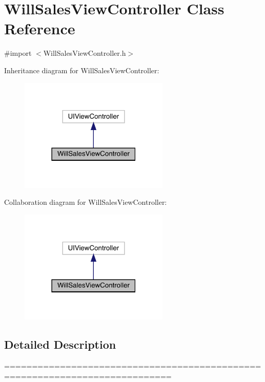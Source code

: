 \hypertarget{interface_will_sales_view_controller}{}\section{Will\+Sales\+View\+Controller Class Reference}
\label{interface_will_sales_view_controller}


{\ttfamily \#import $<$Will\+Sales\+View\+Controller.\+h$>$}



Inheritance diagram for Will\+Sales\+View\+Controller\+:\nopagebreak
\begin{figure}[H]
\begin{center}
\leavevmode
\includegraphics[width=202pt]{interface_will_sales_view_controller__inherit__graph}
\end{center}
\end{figure}


Collaboration diagram for Will\+Sales\+View\+Controller\+:\nopagebreak
\begin{figure}[H]
\begin{center}
\leavevmode
\includegraphics[width=202pt]{interface_will_sales_view_controller__coll__graph}
\end{center}
\end{figure}


\subsection{Detailed Description}
============================================================================


